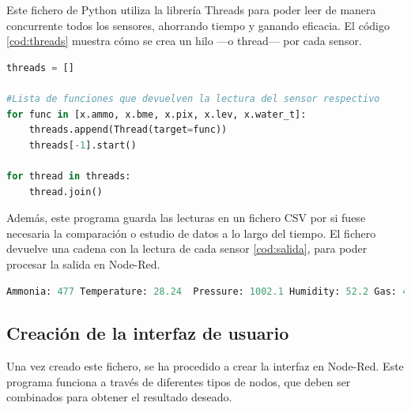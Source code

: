 Este fichero de Python utiliza la librería Threads para poder leer de manera concurrente todos los sensores, ahorrando tiempo y ganando eficacia. El código \ref{cod:threads} muestra cómo se crea un hilo ---o thread--- por cada sensor.\\
\begin{code}[h]
\begin{lstlisting}[language=Python]
threads = []

#Lista de funciones que devuelven la lectura del sensor respectivo
for func in [x.ammo, x.bme, x.pix, x.lev, x.water_t]: 
	threads.append(Thread(target=func))
	threads[-1].start()
	
for thread in threads:
	thread.join()
\end{lstlisting}
\caption[Función para crear un Thread por sensor y obtener su lectura.]{Función para crear un Thread por sensor y obtener su lectura.}
\label{cod:threads}
\end{code}

Además, este programa guarda las lecturas en un fichero CSV por si fuese necesaria la comparación o estudio de datos a lo largo del tiempo. El fichero devuelve una cadena con la lectura de cada sensor \ref{cod:salida}, para poder procesar la salida en Node-Red.\\
\begin{code}[h]
\begin{lstlisting}[language=Python]
Ammonia: 477 Temperature: 28.24  Pressure: 1002.1 Humidity: 52.2 Gas: 4005.9 Water level: 2 Waterproof temp: 28.312 Pixels: [[23.5, 23.0, 23.0, 23.25, 23.0, 23.75, 23.75, 24.0], [24.0, 23.25, 23.0, 19.5, 19.5, 19.75, 19.5, 21.0], [19.0, 19.0, 20.0, 19.75, 20.0, 20.25, 19.0, 19.0], [19.25, 19.75, 18.75, 19.25, 18.25, 19.0, 19.75, 20.0], [17.75, 18.75, 18.75, 19.0, 19.25, 21.5, 22.25, 21.25], [21.5, 21.25, 22.25, 21.75, 21.75, 18.75, 18.25, 18.5], [18.5, 18.75, 18.75, 18.5, 18.5, 18.5, 21.75, 22.75], [21.25, 22.25, 21.75, 21.75, 21.75, 21.75, 21.75, 23.0]]
\end{lstlisting}
\caption[Ejemplo de salida del fichero Python]{Ejemplo de salida del fichero Python}
\label{cod:salida}
\end{code}

\subsection{Creación de la interfaz de usuario}
Una vez creado este fichero, se ha procedido a crear la interfaz en Node-Red. Este programa funciona a través de diferentes tipos de nodos, que deben ser combinados para obtener el resultado deseado.\\

